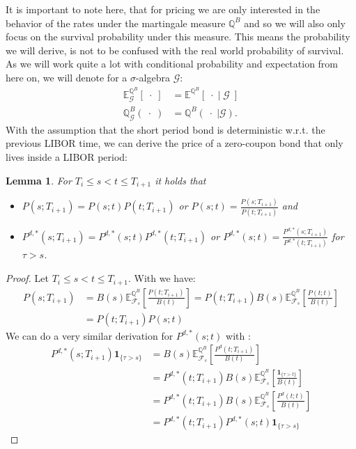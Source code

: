 \documentclass[12pt]{article}
\newtheorem{lemma}[theorem]{Lemma}
\begin{document}
	It is important to note here, that for pricing we are only interested in the behavior of the rates under the martingale measure $\mathbb{Q}^B$ and so we will also only focus on the survival probability under this measure. This means the probability we will derive, is not to be confused with the real world probability of survival.\\
	
	As we will work quite a lot with conditional probability and expectation from here on, we will denote for a $\sigma$-algebra $\mathcal{G}$:
	\begin{align*}
		\mathbb{E}^{\mathbb{Q}^B}_{\mathcal{G}}\left[ \; \cdot \; \right] &=  \mathbb{E}^{\mathbb{Q}^B}\left[ \; \cdot \; | \; \mathcal{G} \; \right]\\
		\mathbb{Q}^B_{\mathcal{G}}\left(\;\cdot \; \right) &= \mathbb{Q}^B\left( \left. \;\cdot \; \right| \mathcal{G} \right).
	\end{align*} 
	With the assumption that the short period bond is deterministic w.r.t. the previous LIBOR time, we can derive the price of a zero-coupon bond that only lives inside a LIBOR period:
	\begin{lemma}
		For $T_i \le s < t \le T_{i+1}$ it holds that
		\begin{itemize}
			\item $P(s;T_{i+1}) = P(s;t)P(t;T_{i+1})$ or 
			$P(s;t) = \frac{P(s;T_{i+1})}{P(t;T_{i+1})}$ and
			\item $P^{d,*}(s;T_{i+1}) = P^{d,*}(s;t)P^{d,*}(t;T_{i+1})$ or 
			$P^{d,*}(s;t) = \frac{P^{d,*}(s;T_{i+1})}{P^{d,*}(t;T_{i+1})}$ for $\tau > s$.
		\end{itemize}
	\end{lemma}
	\begin{proof}
		Let $T_i \le s < t \le T_{i+1}$. With  we have: 
		\begin{align*}
			P(s;T_{i+1}) &= B(s) \mathbb{E}^{\mathbb{Q}^B}_{\mathcal{F}_s}\left[\frac{P(t;T_{i+1})}{B(t)} \right] = P(t;T_{i+1})B(s)\mathbb{E}^{\mathbb{Q}^B}_{\mathcal{F}_s}\left[\frac{P(t;t)}{B(t)}\right]\\
			&=P(t;T_{i+1})P(s;t)
		\end{align*}
		We can do a very similar derivation for $P^{d,*}(s;t)$ with :
		\begin{align*}
			P^{d,*}(s;T_{i+1}) \mathbf{1}_{\{\tau > s\}} &= B(s)\mathbb{E}^{\mathbb{Q}^B}_{\mathcal{F}_{s}}\left[\frac{P^d(t;T_{i+1})}{B(t)} \right]\\
			&= P^{d,*}(t;T_{i+1}) B(s)\mathbb{E}^{\mathbb{Q}^B}_{\mathcal{F}_{s}}\left[\frac{\mathbf{1}_{\{\tau > t\}}}{B(t)} \right]\\
			&= P^{d,*}(t;T_{i+1}) B(s)\mathbb{E}^{\mathbb{Q}^B}_{\mathcal{F}_{s}}\left[\frac{P^d(t;t)}{B(t)} \right] \\
			&= P^{d,*}(t;T_{i+1})P^{d,*}(s;t)\mathbf{1}_{\{\tau > s\}}
		\end{align*}
	\end{proof}
\end{document}
